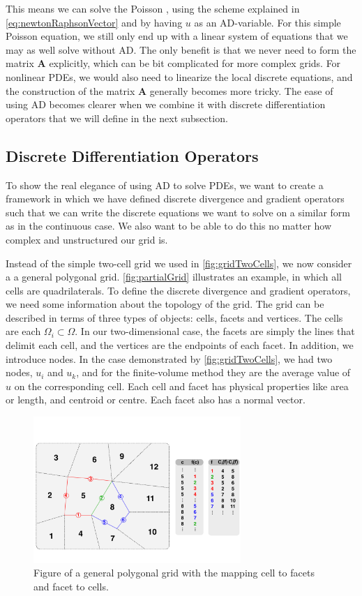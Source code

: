 This means we can solve the Poisson , using the scheme explained in \eqref{eq:newtonRaphsonVector} and by having $u$ as an AD-variable. For this simple Poisson equation, we still only end up with a linear system of equations that we may as well solve without AD. The only benefit is that we never need to form the matrix $\mathbf{A}$ explicitly, which can be bit complicated for more complex grids. For nonlinear PDEs, we would also need to linearize the local discrete equations, and the construction of the matrix \textbf{A} generally becomes more tricky.  The ease of using AD becomes clearer when we combine it with discrete differentiation operators that we will define in the next subsection.

\subsection{Discrete Differentiation Operators}
\label{sec:DiscreteOperators}
To show the real elegance of using AD to solve PDEs, we want to create a framework in which we have defined discrete divergence and gradient operators such that we can write the discrete equations we want to solve on a similar form as in the continuous case. We also want to be able to do this no matter how complex and unstructured our grid is.

Instead of the simple two-cell grid we used in \autoref{fig:gridTwoCells}, we now consider a a general polygonal grid. \autoref{fig:partialGrid} illustrates an example, in which all cells are quadrilaterals. To define the discrete divergence and gradient operators, we need some information about the topology of the grid. The grid can be described in terms of three types of objects: cells, facets and vertices. The cells are each $\Omega_i \subset \Omega$. In our two-dimensional case, the facets are simply the lines that delimit each cell, and the vertices are the endpoints of each facet. In addition, we introduce nodes. In the case demonstrated by \autoref{fig:gridTwoCells}, we had two nodes, $u_i$ and $u_k$, and for the finite-volume method they are the average value of $u$ on the corresponding cell. Each cell and facet has physical properties like area or length, and centroid or centre. Each facet also has a normal vector. 
\begin{figure}[H]
    \centering
    \includegraphics[width = 0.7\textwidth]{figures/grid_cells_facets.pdf}
    \caption{Figure of a general polygonal grid with the mapping cell to facets and facet to cells.}
    \label{fig:partialGrid}
\end{figure}


